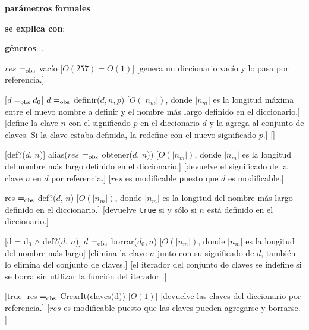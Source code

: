 \begin{Interfaz}
 
    \textbf{parámetros formales}

	\textbf{se explica con}: \par {}
 \par 
      \textbf{géneros}: .


  {$res$ $=_{\mathrm{obs}}$ vacío}
  [$O(257) = O(1)$]
  [genera un diccionario vac\'io y lo pasa por referencia.]
  
  [$d =_{\mathrm{obs}} d_0$]
  {$d$ $=_{\mathrm{obs}}$ definir($d, n, p$)}
 [$\displaystyle O\left(|n_{m}|\right)$, donde $|n_{m}|$ es la longitud máxima entre el nuevo nombre a definir y el nombre más largo definido en el diccionario.]
  [define la clave $n$ con el significado $p$ en el diccionario $d$ y la agrega al conjunto de claves. Si la clave estaba definida, la redefine con el nuevo significado $p$.]
  []

  [def?($d$, $n$)]
  {alias($res$ $=_{\mathrm{obs}}$ obtener($d$, $n$))}
  [$O(|n_{m}|)$, donde $|n_{m}|$ es la longitud del nombre m\'as largo definido en el diccionario.]
  [devuelve el significado de la clave $n$ en $d$ por referencia.]
  [$res$ es modificable puesto que $d$ es modificable.]

  {res $=_{\mathrm{obs}}$ def?($d$, $n$)}
  [$O(|n_{m}|)$, donde $|n_{m}|$ es la longitud del nombre m\'as largo definido en el diccionario.]
  [devuelve \texttt{true} si y s\'olo si $n$ está definido en el diccionario.]
  
  [d = d$_0$ $\land$ def?($d$, $n$)]
  {$d$ $=_{\mathrm{obs}}$ borrar($d_0, n$)}
  [$O(|n_{m}|)$, donde $|n_{m}|$ es la longitud del nombre m\'as largo]
  [elimina la clave $n$ junto con su significado de $d$, también lo elimina del conjunto de claves.]
  [el iterador del conjunto de claves se indefine si se borra sin utilizar la funci\'on del iterador .]

  [true]
  {res $=_{\mathrm{obs}}$ CrearIt(claves(d))}
  [$O(1)$]
  [devuelve las claves del diccionario por referencia.]
  [$res$ es modificable puesto que las claves pueden agregarse y borrarse. ]
  

\end{Interfaz}

